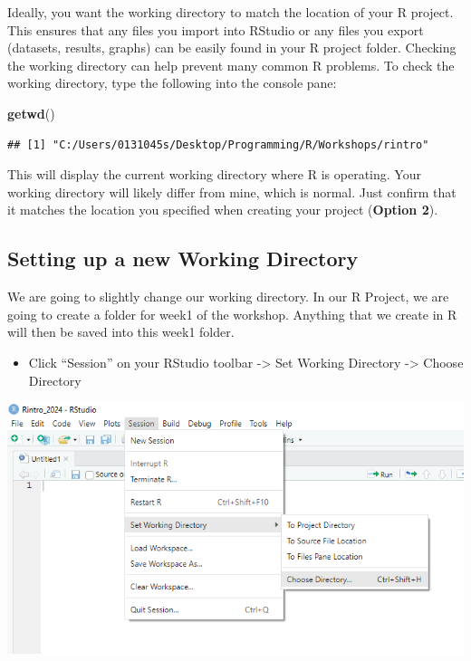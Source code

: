 \documentclass[
]{book}
\newenvironment{Shaded}{\begin{snugshade}}{\end{snugshade}}
\newcommand{\FunctionTok}[1]{\textcolor[rgb]{0.13,0.29,0.53}{\textbf{#1}}}
\newcommand{\NormalTok}[1]{#1}
\providecommand{\tightlist}{%
  \setlength{\itemsep}{0pt}\setlength{\parskip}{0pt}}
\begin{document}
Ideally, you want the working directory to match the location of your R project. This ensures that any files you import into RStudio or any files you export (datasets, results, graphs) can be easily found in your R project folder. Checking the working directory can help prevent many common R problems. To check the working directory, type the following into the console pane:

\begin{Shaded}
\begin{Highlighting}[]
\FunctionTok{getwd}\NormalTok{()}
\end{Highlighting}
\end{Shaded}

\begin{verbatim}
## [1] "C:/Users/0131045s/Desktop/Programming/R/Workshops/rintro"
\end{verbatim}

This will display the current working directory where R is operating. Your working directory will likely differ from mine, which is normal. Just confirm that it matches the location you specified when creating your project (\textbf{Option 2}).

\hypertarget{set_wd}{%
\subsection{Setting up a new Working Directory}\label{set_wd}}

We are going to slightly change our working directory. In our R Project, we are going to create a folder for week1 of the workshop. Anything that we create in R will then be saved into this week1 folder.

\begin{itemize}
\tightlist
\item
  Click ``Session'' on your RStudio toolbar -\textgreater{} Set Working Directory -\textgreater{} Choose Directory
\end{itemize}

\includegraphics{img/01-wd.png}
\end{document}
